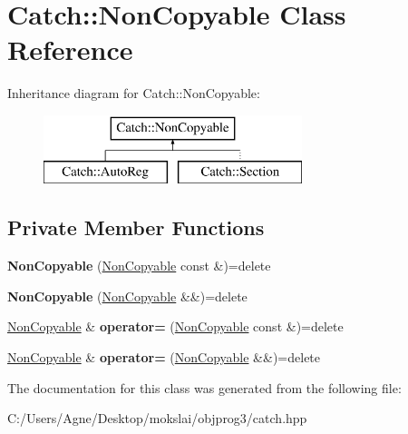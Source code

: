 \hypertarget{class_catch_1_1_non_copyable}{}\section{Catch\+:\+:Non\+Copyable Class Reference}
\label{class_catch_1_1_non_copyable}
Inheritance diagram for Catch\+:\+:Non\+Copyable\+:\begin{figure}[H]
\begin{center}
\leavevmode
\includegraphics[height=2.000000cm]{class_catch_1_1_non_copyable}
\end{center}
\end{figure}
\subsection*{Private Member Functions}
\begin{DoxyCompactItemize}
\item 
\mbox{\label{class_catch_1_1_non_copyable_a74cf3e4aa051c284941e39b436b2f693}} 
{\bfseries Non\+Copyable} (\mbox{\hyperlink{class_catch_1_1_non_copyable}{Non\+Copyable}} const \&)=delete
\item 
\mbox{\label{class_catch_1_1_non_copyable_a09d1d8775db8c495fa40c285b034faa3}} 
{\bfseries Non\+Copyable} (\mbox{\hyperlink{class_catch_1_1_non_copyable}{Non\+Copyable}} \&\&)=delete
\item 
\mbox{\label{class_catch_1_1_non_copyable_a958b5f57d45fdd6f418bec8b46a629ab}} 
\mbox{\hyperlink{class_catch_1_1_non_copyable}{Non\+Copyable}} \& {\bfseries operator=} (\mbox{\hyperlink{class_catch_1_1_non_copyable}{Non\+Copyable}} const \&)=delete
\item 
\mbox{\label{class_catch_1_1_non_copyable_a317697b6d3c4cda093666ce61d3a1e31}} 
\mbox{\hyperlink{class_catch_1_1_non_copyable}{Non\+Copyable}} \& {\bfseries operator=} (\mbox{\hyperlink{class_catch_1_1_non_copyable}{Non\+Copyable}} \&\&)=delete
\end{DoxyCompactItemize}


The documentation for this class was generated from the following file\+:\begin{DoxyCompactItemize}
\item 
C\+:/\+Users/\+Agne/\+Desktop/mokslai/objprog3/catch.\+hpp\end{DoxyCompactItemize}
